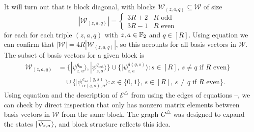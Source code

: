 \documentclass[../thesis-main/thesis-main]{subfiles}
\begin{document}
It will turn out that  is block diagonal, with blocks $\mathcal{W}_{(z,a,q)}\subseteq\mathcal{W}$ of size
\begin{equation}
  \left|\mathcal{W}_{(z,a,q)}\right|=\begin{cases}
    3R+2 & R\text{ odd}\\
    3R-1 & R\text{ even}
  \end{cases}
\end{equation}
for each for each triple $(z,a,q)$ with $z,a\in\mathbb{F}_2$ and $q\in[R]$. Using equation  we can confirm that $|\mathcal{W}|=4R\left|\mathcal{W}_{(z,a,q)}\right|$, so this accounts for all basis vectors in $\mathcal{W}$. The subset of basis vectors for a given block is
\begin{align}
  \mathcal{W}_{(z,a,q)} 
    &=\big\{ |\psi_{z,a}^{q_{\text{in}}}\rangle,|\psi_{z,a}^{q_{\text{out}}}\rangle\big\} \cup\big\{ |\psi_{z,a}^{d(q,s)}\rangle\colon s\in[R],\, s\neq q\text{ if }R\text{ even}\big\} \nonumber \\
    &\quad \cup \big\{ |\psi_{\alpha(q,s),a}^{e_{zx}(q,s)}\rangle\colon x\in\{0,1\},\, s\in[R],\, s\neq q\text{ if }R\text{ even}\big\} .\label{eq:subset_W}
\end{align}
Using equation  and the description of $\mathcal{E}^{\triangle}$ from using the edges of equations  --, we can check by direct inspection that  only has nonzero matrix elements between basis vectors in $\mathcal{W}$ from the same block.  The graph $G^\triangle$ was designed to expand the states $|\mspace{2mu} \overline{\psi_{z,a}} \mspace{2mu} \rangle$, and block structure reflects this idea.
\end{document}
